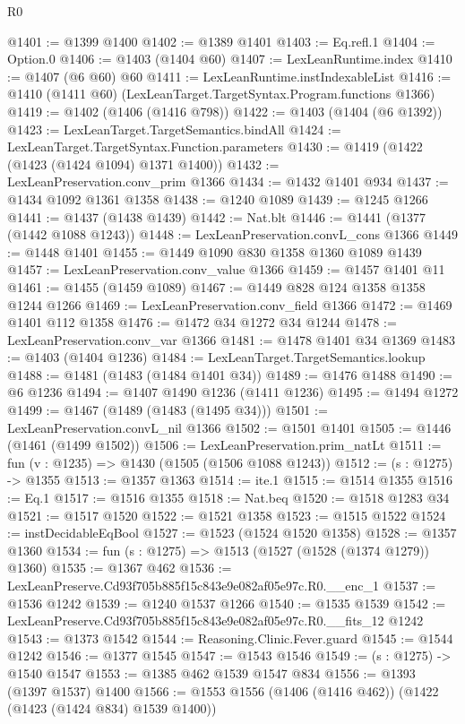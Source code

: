 \begin{lexlean}{R0}
\begin{coremodule}
@1401 := @1399 @1400
@1402 := @1389 @1401
@1403 := Eq.refl.{1}
@1404 := Option.{0}
@1406 := @1403 (@1404 @60)
@1407 := LexLeanRuntime.index
@1410 := @1407 (@6 @60) @60
@1411 := LexLeanRuntime.instIndexableList
@1416 := @1410 (@1411 @60) (LexLeanTarget.TargetSyntax.Program.functions @1366)
@1419 := @1402 (@1406 (@1416 @798))
@1422 := @1403 (@1404 (@6 @1392))
@1423 := LexLeanTarget.TargetSemantics.bindAll
@1424 := LexLeanTarget.TargetSyntax.Function.parameters
@1430 := @1419 (@1422 (@1423 (@1424 @1094) @1371 @1400))
@1432 := LexLeanPreservation.conv_prim @1366
@1434 := @1432 @1401 @934
@1437 := @1434 @1092 @1361 @1358
@1438 := @1240 @1089
@1439 := @1245 @1266
@1441 := @1437 (@1438 @1439)
@1442 := Nat.blt
@1446 := @1441 (@1377 (@1442 @1088 @1243))
@1448 := LexLeanPreservation.convL_cons @1366
@1449 := @1448 @1401
@1455 := @1449 @1090 @830 @1358 @1360 @1089 @1439
@1457 := LexLeanPreservation.conv_value @1366
@1459 := @1457 @1401 @11
@1461 := @1455 (@1459 @1089)
@1467 := @1449 @828 @124 @1358 @1358 @1244 @1266
@1469 := LexLeanPreservation.conv_field @1366
@1472 := @1469 @1401 @112 @1358
@1476 := @1472 @34 @1272 @34 @1244
@1478 := LexLeanPreservation.conv_var @1366
@1481 := @1478 @1401 @34 @1369
@1483 := @1403 (@1404 @1236)
@1484 := LexLeanTarget.TargetSemantics.lookup
@1488 := @1481 (@1483 (@1484 @1401 @34))
@1489 := @1476 @1488
@1490 := @6 @1236
@1494 := @1407 @1490 @1236 (@1411 @1236)
@1495 := @1494 @1272
@1499 := @1467 (@1489 (@1483 (@1495 @34)))
@1501 := LexLeanPreservation.convL_nil @1366
@1502 := @1501 @1401
@1505 := @1446 (@1461 (@1499 @1502))
@1506 := LexLeanPreservation.prim_natLt
@1511 := fun (v : @1235) => @1430 (@1505 (@1506 @1088 @1243))
@1512 := (s : @1275) -> @1355
@1513 := @1357 @1363
@1514 := ite.{1}
@1515 := @1514 @1355
@1516 := Eq.{1}
@1517 := @1516 @1355
@1518 := Nat.beq
@1520 := @1518 @1283 @34
@1521 := @1517 @1520
@1522 := @1521 @1358
@1523 := @1515 @1522
@1524 := instDecidableEqBool
@1527 := @1523 (@1524 @1520 @1358)
@1528 := @1357 @1360
@1534 := fun (s : @1275) => @1513 (@1527 (@1528 (@1374 @1279)) @1360)
@1535 := @1367 @462
@1536 := LexLeanPreserve.Cd93f705b885f15c843e9e082af05e97c.R0.__enc_1
@1537 := @1536 @1242
@1539 := @1240 @1537 @1266
@1540 := @1535 @1539
@1542 := LexLeanPreserve.Cd93f705b885f15c843e9e082af05e97c.R0.__fits_12 @1242
@1543 := @1373 @1542
@1544 := Reasoning.Clinic.Fever.guard
@1545 := @1544 @1242
@1546 := @1377 @1545
@1547 := @1543 @1546
@1549 := (s : @1275) -> @1540 @1547
@1553 := @1385 @462 @1539 @1547 @834
@1556 := @1393 (@1397 @1537) @1400
@1566 := @1553 @1556 (@1406 (@1416 @462)) (@1422 (@1423 (@1424 @834) @1539 @1400))

\end{coremodule}
\end{lexlean}
